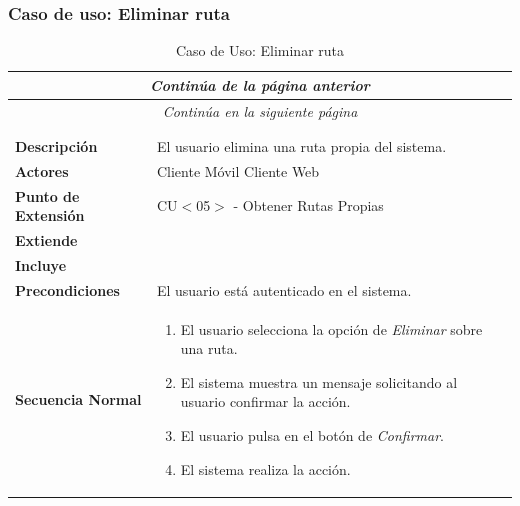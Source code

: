 \newpage
\subsubsection*{Caso de uso: Eliminar ruta}
\begin{longtable}{| p{4cm} | p{10cm} |}
\endfirsthead
\multicolumn{2}{c}{\textit{Continúa de la página anterior}}\\[12pt]
\hline
\endhead
\hline
\multicolumn{2}{c}{\textit{Continúa en la siguiente página}} \\
\endfoot
\hline
\caption{Caso de Uso: Eliminar ruta}\label{fig:1}\\
\endlastfoot


\hline
\multicolumn{2}{|c|}{\textbf{CU$<$06$>$ - Eliminar Ruta}} \\

\hline
\textbf{Descripción} &
El usuario elimina una ruta propia del sistema.\\

\hline
\textbf{Actores} &
Cliente Móvil\newline
Cliente Web\\

\hline
\textbf{Punto de Extensión} &
CU$<$05$>$ - Obtener Rutas Propias
\\

\hline
\textbf{Extiende} &
\\

\hline
\textbf{Incluye} &
\\

\hline
\textbf{Precondiciones} &
El usuario está autenticado en el sistema.\\

\hline
\textbf{Secuencia Normal} &\mbox{}\par\vspace{-\baselineskip}
\begin{enumerate}[leftmargin=0.7cm, topsep=0.1cm]
\item El usuario selecciona la opción de \textit{Eliminar} sobre una ruta.
\item El sistema muestra un mensaje solicitando al usuario confirmar la acción.
\item El usuario pulsa en el botón de \textit{Confirmar}.
\item El sistema realiza la acción.
\end{enumerate}\\


\end{longtable}
